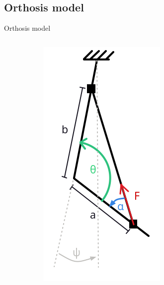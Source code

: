 \documentclass[aspectratio=169]{beamer}
\begin{document}
\subsection{Orthosis model}
\begin{frame}{Orthosis model}
\begin{figure}[htbp]
\begin{columns}
\begin{column}{0.5\textwidth}
    \centering
    \begin{subfigure}{0.2\textwidth}
        \centering
        \includegraphics[width=\linewidth]{elbow.png}

\end{subfigure}
\end{column}
\end{columns}
\end{figure}
\end{frame}
\end{document}
